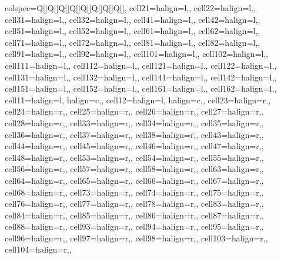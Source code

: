 \begin{table}
\centering
\begin{talltblr}[         %
caption={Descriptive statistics of respondent characteristics, by treatment group status (framing experiment)\label{tab:balance-table-framing-experiment}},
]                     %
{                     %
colspec={Q[]Q[]Q[]Q[]Q[]Q[]Q[]Q[]},
cell{2}{1}={}{halign=l,},
cell{2}{2}={}{halign=l,},
cell{3}{1}={}{halign=l,},
cell{3}{2}={}{halign=l,},
cell{4}{1}={}{halign=l,},
cell{4}{2}={}{halign=l,},
cell{5}{1}={}{halign=l,},
cell{5}{2}={}{halign=l,},
cell{6}{1}={}{halign=l,},
cell{6}{2}={}{halign=l,},
cell{7}{1}={}{halign=l,},
cell{7}{2}={}{halign=l,},
cell{8}{1}={}{halign=l,},
cell{8}{2}={}{halign=l,},
cell{9}{1}={}{halign=l,},
cell{9}{2}={}{halign=l,},
cell{10}{1}={}{halign=l,},
cell{10}{2}={}{halign=l,},
cell{11}{1}={}{halign=l,},
cell{11}{2}={}{halign=l,},
cell{12}{1}={}{halign=l,},
cell{12}{2}={}{halign=l,},
cell{13}{1}={}{halign=l,},
cell{13}{2}={}{halign=l,},
cell{14}{1}={}{halign=l,},
cell{14}{2}={}{halign=l,},
cell{15}{1}={}{halign=l,},
cell{15}{2}={}{halign=l,},
cell{16}{1}={}{halign=l,},
cell{16}{2}={}{halign=l,},
cell{1}{1}={}{halign=l, halign=c,},
cell{1}{2}={}{halign=l, halign=c,},
cell{2}{3}={}{halign=r,},
cell{2}{4}={}{halign=r,},
cell{2}{5}={}{halign=r,},
cell{2}{6}={}{halign=r,},
cell{2}{7}={}{halign=r,},
cell{2}{8}={}{halign=r,},
cell{3}{3}={}{halign=r,},
cell{3}{4}={}{halign=r,},
cell{3}{5}={}{halign=r,},
cell{3}{6}={}{halign=r,},
cell{3}{7}={}{halign=r,},
cell{3}{8}={}{halign=r,},
cell{4}{3}={}{halign=r,},
cell{4}{4}={}{halign=r,},
cell{4}{5}={}{halign=r,},
cell{4}{6}={}{halign=r,},
cell{4}{7}={}{halign=r,},
cell{4}{8}={}{halign=r,},
cell{5}{3}={}{halign=r,},
cell{5}{4}={}{halign=r,},
cell{5}{5}={}{halign=r,},
cell{5}{6}={}{halign=r,},
cell{5}{7}={}{halign=r,},
cell{5}{8}={}{halign=r,},
cell{6}{3}={}{halign=r,},
cell{6}{4}={}{halign=r,},
cell{6}{5}={}{halign=r,},
cell{6}{6}={}{halign=r,},
cell{6}{7}={}{halign=r,},
cell{6}{8}={}{halign=r,},
cell{7}{3}={}{halign=r,},
cell{7}{4}={}{halign=r,},
cell{7}{5}={}{halign=r,},
cell{7}{6}={}{halign=r,},
cell{7}{7}={}{halign=r,},
cell{7}{8}={}{halign=r,},
cell{8}{3}={}{halign=r,},
cell{8}{4}={}{halign=r,},
cell{8}{5}={}{halign=r,},
cell{8}{6}={}{halign=r,},
cell{8}{7}={}{halign=r,},
cell{8}{8}={}{halign=r,},
cell{9}{3}={}{halign=r,},
cell{9}{4}={}{halign=r,},
cell{9}{5}={}{halign=r,},
cell{9}{6}={}{halign=r,},
cell{9}{7}={}{halign=r,},
cell{9}{8}={}{halign=r,},
cell{10}{3}={}{halign=r,},
cell{10}{4}={}{halign=r,},
}
\end{talltblr}
\end{table}
